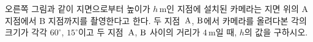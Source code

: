 \noindent\begin{minipage}[t]{0.58\linewidth}\vspace{0pt}\raggedright 오른쪽 그림과 같이 지면으로부터 높이가 $h\,\mathrm{m}$인 지점에 설치된 카메라는 지면 위의 A 지점에서 B 지점까지를 촬영한다고 한다. 두 지점~$\mathrm{A}$, $\mathrm{B}$에서 카메라를 올려다본 각의 크기가 각각 $60^\circ$, $15^\circ$이고 두 지점~$\mathrm{A}$, $\mathrm{B}$ 사이의 거리가 $4\,\mathrm{m}$일 때, $h$의 값을 구하시오. \end{minipage}\hfill\begin{minipage}[t]{0.4\linewidth}\vspace{0pt}\centering \resizebox{\ifdim\width>\linewidth\linewidth\else\width\fi}{!}{}\end{minipage}\par
